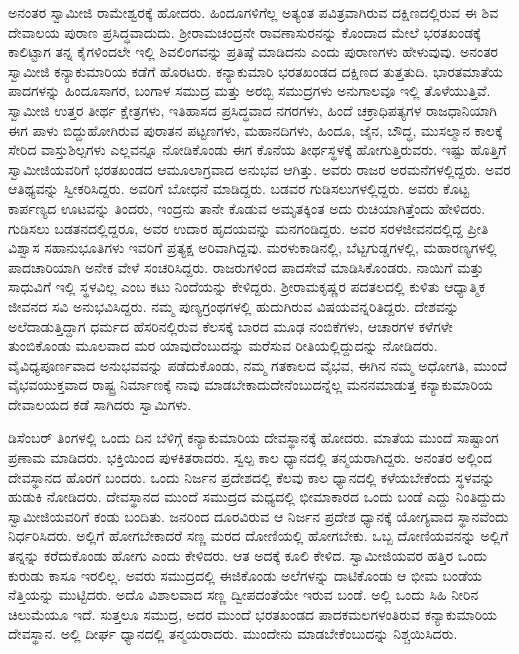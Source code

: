  ಅನಂತರ ಸ್ವಾಮೀಜಿ ರಾಮೇಶ್ವರಕ್ಕೆ ಹೋದರು. ಹಿಂದೂಗಳಿಗೆಲ್ಲ ಅತ್ಯಂತ ಪವಿತ್ರವಾಗಿರುವ ದಕ್ಷಿಣದಲ್ಲಿರುವ ಈ ಶಿವ ದೇವಾಲಯ ಪುರಾಣ ಪ್ರಸಿದ್ಧವಾದುದು. ಶ‍್ರೀರಾಮಚಂದ್ರನೇ ರಾವಣಾಸುರನನ್ನು ಕೊಂದಾದ ಮೇಲೆ ಭರತಖಂಡಕ್ಕೆ ಕಾಲಿಟ್ಟಾಗ ತನ್ನ ಕೈಗಳಿಂದಲೇ ಇಲ್ಲಿ ಶಿವಲಿಂಗವನ್ನು ಪ್ರತಿಷ್ಠೆ ಮಾಡಿದನು ಎಂದು ಪುರಾಣಗಳು ಹೇಳುವುವು. ಅನಂತರ ಸ್ವಾಮೀಜಿ ಕನ್ಯಾಕುಮಾರಿಯ ಕಡೆಗೆ ಹೊರಟರು. ಕನ್ಯಾಕುಮಾರಿ ಭರತಖಂಡದ ದಕ್ಷಿಣದ ತುತ್ತತುದಿ. ಭಾರತಮಾತೆಯ ಪಾದಗಳನ್ನು ಹಿಂದೂಸಾಗರ, ಬಂಗಾಳ ಸಮುದ್ರ ಮತ್ತು ಅರಬ್ಬಿ ಸಮುದ್ರಗಳು ಅನುಗಾಲವೂ ಇಲ್ಲಿ ತೊಳೆಯುತ್ತಿವೆ. ಸ್ವಾಮೀಜಿ ಉತ್ತರ ತೀರ್ಥ ಕ್ಷೇತ್ರಗಳು, ಇತಿಹಾಸದ ಪ್ರಸಿದ್ಧವಾದ ನಗರಗಳು, ಹಿಂದೆ ಚಕ್ರಾಧಿಪತ್ಯಗಳ ರಾಜಧಾನಿಯಾಗಿ ಈಗ ಪಾಳು ಬಿದ್ದುಹೋಗಿರುವ ಪುರಾತನ ಪಟ್ಟಣಗಳು, ಮಹಾನದಿಗಳು, ಹಿಂದೂ, ಜೈನ, ಬೌದ್ಧ, ಮುಸಲ್ಮಾನ ಕಾಲಕ್ಕೆ ಸೇರಿದ ವಾಸ್ತುಶಿಲ್ಪಗಳು ಎಲ್ಲವನ್ನೂ ನೋಡಿಕೊಂಡು ಈಗ ಕೊನೆಯ ತೀರ್ಥಸ್ಥಳಕ್ಕೆ ಹೋಗುತ್ತಿರುವರು. ಇಷ್ಟು ಹೊತ್ತಿಗೆ ಸ್ವಾಮೀಜಿಯವರಿಗೆ ಭರತಖಂಡದ ಆಮೂಲಾಗ್ರವಾದ ಅನುಭವ ಆಗಿತ್ತು. ಅವರು ರಾಜರ ಅರಮನೆಗಳಲ್ಲಿದ್ದರು. ಅವರ ಆತಿಥ್ಯವನ್ನು ಸ್ವೀಕರಿಸಿದ್ದರು. ಅವರಿಗೆ ಬೋಧನೆ ಮಾಡಿದ್ದರು. ಬಡವರ ಗುಡಿಸಲುಗಳಲ್ಲಿದ್ದರು. ಅವರು ಕೊಟ್ಟ ಕಾರ್ಪಣ್ಯದ ಊಟವನ್ನು ತಿಂದರು, ಇಂದ್ರನು ತಾನೇ ಕೊಡುವ ಅಮೃತಕ್ಕಿಂತ ಅದು ರುಚಿಯಾಗಿತ್ತೆಂದು ಹೇಳಿದರು. ಗುಡಿಸಲು ಬಡತನದಲ್ಲಿದ್ದರೂ, ಅವರ ಉದಾರ ಹೃದಯವನ್ನು ಮನಗಂಡಿದ್ದರು. ಅವರ ಸರಳಜೀವನದಲ್ಲಿದ್ದ ಪ್ರೀತಿ ವಿಶ್ವಾಸ ಸಹಾನುಭೂತಿಗಳು ಇವರಿಗೆ ಪ್ರತ್ಯಕ್ಷ ಅರಿವಾಗಿದ್ದವು. ಮರಳುಕಾಡಿನಲ್ಲಿ, ಬೆಟ್ಟಗುಡ್ಡಗಳಲ್ಲಿ, ಮಹಾರಣ್ಯಗಳಲ್ಲಿ ಪಾದಚಾರಿಯಾಗಿ ಅನೇಕ ವೇಳೆ ಸಂಚರಿಸಿದ್ದರು. ರಾಜರುಗಳಿಂದ ಪಾದಸೇವೆ ಮಾಡಿಸಿಕೊಂಡರು. ನಾಯಿಗೆ ಮತ್ತು ಸಾಧುವಿಗೆ ಇಲ್ಲಿ ಸ್ಥಳವಿಲ್ಲ ಎಂಬ ಕಟು ನಿಂದೆಯನ್ನು ಕೇಳಿದ್ದರು. ಶ‍್ರೀರಾಮಕೃಷ್ಣರ ಪದತಲದಲ್ಲಿ ಕುಳಿತು ಆಧ್ಯಾತ್ಮಿಕ ಜೀವನದ ಸವಿ ಅನುಭವಿಸಿದ್ದರು. ನಮ್ಮ ಪುಣ್ಯಗ್ರಂಥಗಳಲ್ಲಿ ಹುದುಗಿರುವ ವಿಷಯವನ್ನರಿತಿದ್ದರು. ದೇಶವನ್ನು ಅಲೆದಾಡುತ್ತಿದ್ದಾಗ ಧರ್ಮದ ಹೆಸರಿನಲ್ಲಿರುವ ಕೆಲಸಕ್ಕೆ ಬಾರದ ಮೂಢ ನಂಬಿಕೆಗಳು, ಆಚಾರಗಳ ಕಳೆಗಳೇ ತುಂಬಿಕೊಂಡು ಮೂಲವಾದ ಮರ ಯಾವುದೆಂಬುದನ್ನು ಮರೆಸುವ ರೀತಿಯಲ್ಲಿದ್ದುದನ್ನು ನೋಡಿದರು. ವೈವಿಧ್ಯಪೂರ್ಣವಾದ ಅನುಭವವನ್ನು ಪಡೆದುಕೊಂಡು, ನಮ್ಮ ಗತಕಾಲದ ವೈಭವ, ಈಗಿನ ನಮ್ಮ ಅಧೋಗತಿ, ಮುಂದೆ ವೈಭವಯುಕ್ತವಾದ ರಾಷ್ಟ್ರ ನಿರ್ಮಾಣಕ್ಕೆ ನಾವು ಮಾಡಬೇಕಾದುದೇನೆಂಬುದನ್ನೆಲ್ಲ ಮನನಮಾಡುತ್ತ ಕನ್ಯಾಕುಮಾರಿಯ ದೇವಾಲಯದ ಕಡೆ ಸಾಗಿದರು ಸ್ವಾಮಿಗಳು. 

 ಡಿಸೆಂಬರ್ ತಿಂಗಳಲ್ಲಿ ಒಂದು ದಿನ ಬೆಳಿಗ್ಗೆ ಕನ್ಯಾಕುಮಾರಿಯ ದೇವಸ್ಥಾನಕ್ಕೆ ಹೋದರು. ಮಾತೆಯ ಮುಂದೆ ಸಾಷ್ಟಾಂಗ ಪ್ರಣಾಮ ಮಾಡಿದರು. ಭಕ್ತಿಯಿಂದ ಪುಳಕಿತರಾದರು. ಸ್ವಲ್ಪ ಕಾಲ ಧ್ಯಾನದಲ್ಲಿ ತನ್ಮಯರಾಗಿದ್ದರು. ಅನಂತರ ಅಲ್ಲಿಂದ ದೇವಸ್ಥಾನದ ಹೊರಗೆ ಬಂದರು. ಒಂದು ನಿರ್ಜನ ಪ್ರದೇಶದಲ್ಲಿ ಕೆಲವು ಕಾಲ ಧ್ಯಾನದಲ್ಲಿ ಕಳೆಯಬೇಕೆಂದು ಸ್ಥಳವನ್ನು ಹುಡುಕಿ ನೋಡಿದರು. ದೇವಸ್ಥಾನದ ಮುಂದೆ ಸಮುದ್ರದ ಮಧ್ಯದಲ್ಲಿ ಭೀಮಾಕಾರದ ಒಂದು ಬಂಡೆ ಎದ್ದು ನಿಂತಿದ್ದುದು ಸ್ವಾಮೀಜಿಯವರಿಗೆ ಕಂಡು ಬಂದಿತು. ಜನರಿಂದ ದೂರವಿರುವ ಆ ನಿರ್ಜನ ಪ್ರದೇಶ ಧ್ಯಾನಕ್ಕೆ ಯೋಗ್ಯವಾದ ಸ್ಥಾನವೆಂದು ನಿರ್ಧರಿಸಿದರು. ಅಲ್ಲಿಗೆ ಹೋಗಬೇಕಾದರೆ ಸಣ್ಣ ಮರದ ದೋಣಿಯಲ್ಲಿ ಹೋಗಬೇಕು. ಒಬ್ಬ ದೋಣಿಯವನನ್ನು ಅಲ್ಲಿಗೆ ತನ್ನನ್ನು ಕರೆದುಕೊಂಡು ಹೋಗು ಎಂದು ಕೇಳಿದರು. ಆತ ಅದಕ್ಕೆ ಕೂಲಿ ಕೇಳಿದ. ಸ್ವಾಮೀಜಿಯವರ ಹತ್ತಿರ ಒಂದು ಕುರುಡು ಕಾಸೂ ಇರಲಿಲ್ಲ. ಅವರು ಸಮುದ್ರದಲ್ಲಿ ಈಜಿಕೊಂಡು ಅಲೆಗಳನ್ನು ದಾಟಿಕೊಂಡು ಆ ಭೀಮ ಬಂಡೆಯ ನೆತ್ತಿಯನ್ನು ಮುಟ್ಟಿದರು. ಅದೊ ವಿಶಾಲವಾದ ಸಣ್ಣ ದ್ವೀಪದಂತೆಯೇ ಇರುವ ಬಂಡೆ. ಅಲ್ಲಿ ಒಂದು ಸಿಹಿ ನೀರಿನ ಚಿಲುಮೆಯೂ ಇದೆ. ಸುತ್ತಲೂ ಸಮುದ್ರ, ಅದರ ಮುಂದೆ ಭರತಖಂಡದ ಪಾದಕಮಲಗಳಂತಿರುವ ಕನ್ಯಾಕುಮಾರಿಯ ದೇವಸ್ಥಾನ. ಅಲ್ಲಿ ದೀರ್ಘ ಧ್ಯಾನದಲ್ಲಿ ತನ್ಮಯರಾದರು. ಮುಂದೇನು ಮಾಡಬೇಕೆಂಬುದನ್ನು ನಿಶ್ಚಯಿಸಿದರು. 


